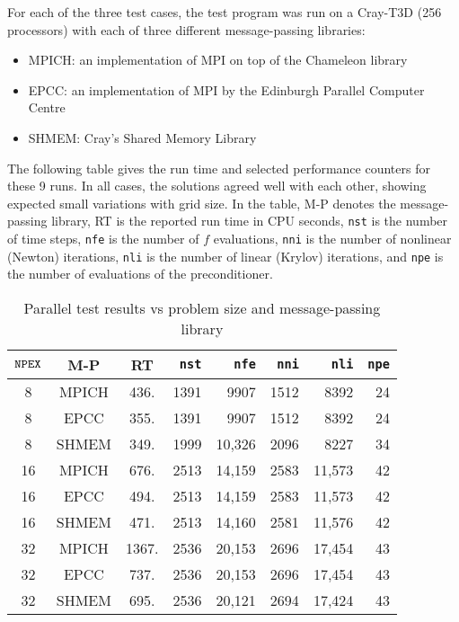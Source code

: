 For each of the three test cases, the test program was run on a Cray-T3D
(256 processors) with each of three different message-passing libraries:

\begin{itemize}
\item  MPICH: an implementation of MPI on top of the Chameleon library

\item  EPCC: an implementation of MPI by the Edinburgh Parallel Computer
Centre

\item  SHMEM: Cray's Shared Memory Library
\end{itemize}

The following table gives the run time and selected performance counters for
these 9 runs. In all cases, the solutions agreed well with each other,
showing expected small variations with grid size. In the table, M-P denotes
the message-passing library, RT is the reported run time in CPU seconds, 
{\tt nst} is the number of time steps, {\tt nfe} is the number of $f$
evaluations, {\tt nni} is the number of nonlinear (Newton) iterations,
{\tt nli} is the number of linear (Krylov) iterations, and {\tt npe} is the
number of evaluations of the preconditioner.

\begin{table}[htb]
\begin{center}
\begin{tabular}{||c|c|c|r|r|r|r|r||}
\hline
${\tt NPEX}$ & M-P & RT & {\tt nst} & {\tt nfe} & {\tt nni} & {\tt nli} & 
{\tt npe} \\ \hline
8 & MPICH & 436. & 1391 & 9907 & 1512 & 8392 & 24 \\ \hline
8 & EPCC & 355. & 1391 & 9907 & 1512 & 8392 & 24 \\ \hline
8 & SHMEM & 349. & 1999 & 10,326 & 2096 & 8227 & 34 \\ \hline\hline
16 & MPICH & 676. & 2513 & 14,159 & 2583 & 11,573 & 42 \\ \hline
16 & EPCC & 494. & 2513 & 14,159 & 2583 & 11,573 & 42 \\ \hline
16 & SHMEM & 471. & 2513 & 14,160 & 2581 & 11,576 & 42 \\ \hline\hline
32 & MPICH & 1367. & 2536 & 20,153 & 2696 & 17,454 & 43 \\ \hline
32 & EPCC & 737. & 2536 & 20,153 & 2696 & 17,454 & 43 \\ \hline
32 & SHMEM & 695. & 2536 & 20,121 & 2694 & 17,424 & 43 \\ \hline
\end{tabular}
\label{testtable}
\end{center}
\caption{Parallel {\cvode} test results vs problem size and message-passing library}
\end{table}

